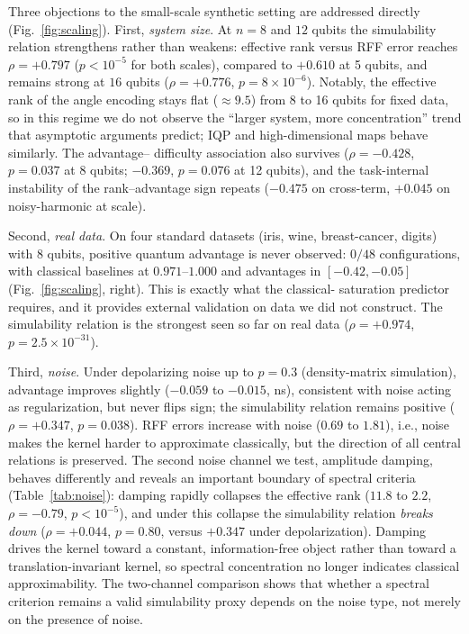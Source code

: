 \documentclass[a4paper,unpublished,onecolumn,nopdfoutputerror,12pt]{quantumarticle}
\begin{document}
Three objections to the small-scale synthetic setting are addressed directly (Fig.~\ref{fig:scaling}).
First, \emph{system size}. At $n=8$ and $12$ qubits the simulability relation strengthens
rather than weakens: effective rank versus RFF error reaches $\rho=+0.797$ ($p<10^{-5}$
for both scales), compared to $+0.610$ at 5 qubits, and remains strong at $16$ qubits
($\rho=+0.776$, $p=8\times10^{-6}$). Notably, the effective rank of the
angle encoding stays flat ($\approx9.5$) from 8 to 16 qubits for fixed data, so in this
regime we do not observe the ``larger system, more concentration'' trend that asymptotic
arguments predict; IQP and high-dimensional maps behave similarly. The advantage--
difficulty association also survives ($\rho=-0.428$, $p=0.037$ at 8 qubits; $-0.369$,
$p=0.076$ at 12 qubits), and the task-internal instability of the rank--advantage sign
repeats ($-0.475$ on cross-term, $+0.045$ on noisy-harmonic at scale).

Second, \emph{real data}. On four standard datasets (iris, wine, breast-cancer,
digits) with 8 qubits, positive quantum advantage is never observed: $0/48$
configurations, with classical baselines at $0.971$--$1.000$ and advantages in
$[-0.42,-0.05]$ (Fig.~\ref{fig:scaling}, right). This is exactly what the classical-
saturation predictor requires, and it provides external validation on data we did not
construct. The simulability relation is the strongest seen so far on real data
($\rho=+0.974$, $p=2.5\times10^{-31}$).

Third, \emph{noise}. Under depolarizing noise up to $p=0.3$ (density-matrix simulation),
advantage improves slightly ($-0.059$ to $-0.015$, ns), consistent with noise acting as
regularization, but never flips sign; the simulability relation remains positive
($\rho=+0.347$, $p=0.038$). RFF errors increase with noise ($0.69$ to $1.81$), i.e.,
noise makes the kernel harder to approximate classically, but the direction of all
central relations is preserved. The second noise channel we test, amplitude damping,
behaves differently and reveals an important boundary of spectral criteria
(Table~\ref{tab:noise}): damping rapidly collapses the effective rank ($11.8$ to $2.2$,
$\rho=-0.79$, $p<10^{-5}$), and under this collapse the simulability relation
\emph{breaks down} ($\rho=+0.044$, $p=0.80$, versus $+0.347$ under depolarization).
Damping drives the kernel toward a constant, information-free object rather than toward
a translation-invariant kernel, so spectral concentration no longer indicates classical
approximability. The two-channel comparison shows that whether a spectral criterion
remains a valid simulability proxy depends on the noise type, not merely on the
presence of noise.
\end{document}
